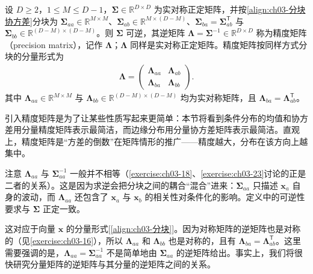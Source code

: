 \documentclass[../../main.tex]{subfiles}
\begin{document}
\begin{definition}[精度矩阵]\label{definition:ch03-精度矩阵}
设 $D\geqslant2$，$1\leqslant M\leqslant D-1$，$\boldsymbol{\Sigma}\in\mathbb{R}^{D\times D}$ 为实对称正定矩阵，并按\eqref{align:ch03-分块协方差}分块为 $\boldsymbol{\Sigma}_{aa}\in\mathbb{R}^{M\times M}$、$\boldsymbol{\Sigma}_{ab}\in\mathbb{R}^{M\times(D-M)}$、$\boldsymbol{\Sigma}_{ba}=\boldsymbol{\Sigma}_{ab}^{\mathsf{T}}$ 与 $\boldsymbol{\Sigma}_{bb}\in\mathbb{R}^{(D-M)\times(D-M)}$。则 $\boldsymbol{\Sigma}$ 可逆，其逆矩阵 $\boldsymbol{\Lambda}=\boldsymbol{\Sigma}^{-1}\in\mathbb{R}^{D\times D}$ 称为精度矩阵（precision matrix），记作 $\boldsymbol{\Lambda}$；$\boldsymbol{\Lambda}$ 同样是实对称正定矩阵。精度矩阵按同样方式分块的分量形式为
\begin{align}
\boldsymbol{\Lambda}=\begin{pmatrix}\boldsymbol{\Lambda}_{aa} & \boldsymbol{\Lambda}_{ab}\\ \boldsymbol{\Lambda}_{ba} & \boldsymbol{\Lambda}_{bb}\end{pmatrix}.
\label{align:ch03-精度矩阵分块}
\end{align}
其中 $\boldsymbol{\Lambda}_{aa}\in\mathbb{R}^{M\times M}$ 与 $\boldsymbol{\Lambda}_{bb}\in\mathbb{R}^{(D-M)\times(D-M)}$ 均为实对称矩阵，且 $\boldsymbol{\Lambda}_{ba}=\boldsymbol{\Lambda}_{ab}^{\mathsf{T}}$。
\end{definition}

\begin{remark}
引入精度矩阵是为了让某些性质写起来更简单：本节将看到条件分布的均值和协方差用分量精度矩阵表示最简洁，而边缘分布用分量协方差矩阵表示最简洁。直观上，精度矩阵是“方差的倒数”在矩阵情形的推广——精度越大，分布在该方向上越集中。

注意 $\boldsymbol{\Lambda}_{aa}$ 与 $\boldsymbol{\Sigma}_{aa}^{-1}$ 一般并不相等（\cref{exercise:ch03-18}、\cref{exercise:ch03-23}讨论的正是二者的关系）。这是因为求逆会把分块之间的耦合“混合”进来：$\boldsymbol{\Sigma}_{aa}$ 只描述 $\boldsymbol{x}_a$ 自身的波动，而 $\boldsymbol{\Lambda}_{aa}$ 还包含了 $\boldsymbol{x}_a$ 与 $\boldsymbol{x}_b$ 的相关性对条件化的影响。定义中的可逆性要求与 $\boldsymbol{\Sigma}$ 正定一致。
\end{remark}

这对应于向量 $\boldsymbol{x}$ 的分量形式[\eqref{align:ch03-分块}]。因为对称矩阵的逆矩阵也是对称的（见\cref{exercise:ch03-16}），所以 $\boldsymbol{\Lambda}_{aa}$ 和 $\boldsymbol{\Lambda}_{bb}$ 也是对称的，且有 $\boldsymbol{\Lambda}_{ba}=\boldsymbol{\Lambda}_{ab}^{\mathsf{T}}$。这里需要强调的是，$\boldsymbol{\Lambda}_{aa}=\boldsymbol{\Sigma}_{aa}^{-1}$ 不是简单地由 $\boldsymbol{\Sigma}_{aa}$ 的逆矩阵给出。事实上，我们将很快研究分量矩阵的逆矩阵与其分量的逆矩阵之间的关系。
\end{document}
